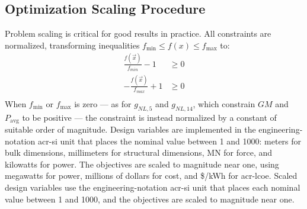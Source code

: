 \subsection{Optimization Scaling Procedure}
Problem scaling is critical for good results in practice.
All constraints are normalized, transforming inequalities $f_{\text{min}} \leq f(x) \leq f_{\text{max}}$ to:
\begin{equation}
\begin{aligned}
    \frac{f(\vec{x})}{f_{min}}-1 &\geq 0 \\
    -\frac{f(\vec{x})}{f_{max}}+1 &\geq 0 \\
\end{aligned}
\end{equation}
When $f_{\text{min}}$ or $f_{\text{max}}$ is zero --- as for $g_{NL,5}$ and $g_{NL,14}$, which constrain $GM$ and $P_{\text{avg}}$ to be positive --- the constraint is instead normalized by a constant of suitable order of magnitude.
\ifdefined\DISSERTATION
    Design variables are implemented in the engineering-notation \gls{acr-si} unit that places the nominal value between 1 and 1000: meters for bulk dimensions, millimeters for structural dimensions, MN for force, and kilowatts for power.
    The objectives are scaled to magnitude near one, using megawatts for power, millions of dollars for cost, and \$/kWh for \gls{acr-lcoe}.
\else
    Scaled design variables use the engineering-notation \gls{acr-si} unit that places each nominal value between 1 and 1000, and the objectives are scaled to magnitude near one.
\fi

